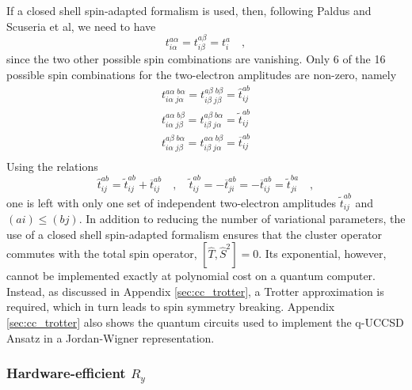 \documentclass[aps,pra,onecolumn]{revtex4-2}
\newcommand{\ry}{R_y}
\begin{document}
If a closed shell spin-adapted formalism is used, then, following Paldus and Scuseria et al, we need to have
\begin{equation}
t^{a \alpha}_{i \alpha} = t^{a \beta}_{i \beta} = t^a_i \quad,
\end{equation}
since the two other possible spin combinations are vanishing. 
Only 6 of the 16 possible spin combinations for the two-electron amplitudes are non-zero, namely
\begin{equation}
\begin{split}
t^{a \alpha \; b \alpha}_{i \alpha \; j \alpha} = t^{a \beta \; b \beta}_{i \beta\; j\beta} = \hat{t}^{ab}_{ij} \\
t^{a \alpha \; b \beta}_{i \alpha \; j \beta} = t^{a \beta \; b \alpha}_{i \beta\; j\alpha} = \tilde{t}^{ab}_{ij} \\
t^{a \beta \; b \alpha}_{i \alpha \; j \beta} = t^{a \alpha \; b \beta}_{i \beta\; j\alpha} = \overline{t}^{ab}_{ij} \\
\end{split}
\end{equation}
Using the relations
\begin{equation}
\hat{t}^{ab}_{ij} = \tilde{t}^{ab}_{ij} + \overline{t}^{ab}_{ij}
\quad,\quad
\tilde{t}^{ab}_{ij} = - \overline{t}^{ab}_{ji} = - \overline{t}^{ab}_{ij} = \tilde{t}^{ba}_{ji}
\quad,
\end{equation}
one is left with only one set of independent two-electron amplitudes $\tilde{t}^{ab}_{ij}$ and $(ai) \leq (bj)$. In addition to reducing the 
number of variational parameters, the use of a closed shell spin-adapted formalism ensures that the cluster operator commutes with 
the total spin operator, $[ \hat{T} , \hat{S}^2 ] = 0$.
Its exponential, however, cannot be implemented exactly at polynomial cost on a quantum computer. 
Instead, as discussed in Appendix \ref{sec:cc_trotter}, a Trotter approximation is required, which in turn leads to spin symmetry breaking.
Appendix \ref{sec:cc_trotter} also shows the quantum circuits used to implement the q-UCCSD Ansatz in a Jordan-Wigner representation.


\subsubsection{Hardware-efficient $\ry$}
\end{document}
